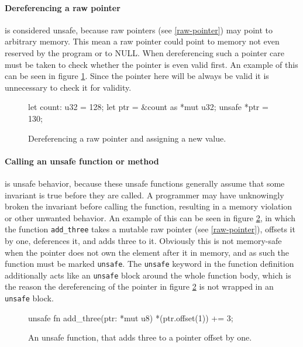 \documentclass[twocolumn]{article}
\begin{document}
\paragraph{Dereferencing a raw pointer} is considered unsafe, because raw pointers (see \ref{raw-pointer}) may point to arbitrary memory.
This mean a raw pointer could point to memory not even reserved by the program or to NULL.
When dereferencing such a pointer care must be taken to check whether the pointer is even valid first.
An example of this can be seen in figure \ref{unsafe-derefencing}.
Since the pointer here will be always be valid it is unnecessary to check it for validity.
\begin{figure}
\begin{rustcode}
let count: u32 = 128;
let ptr = &count as *mut u32;
unsafe {
    *ptr = 130;
}
\end{rustcode}
\vspace{-2em}
\caption{Dereferencing a raw pointer and assigning a new value.}
\label{unsafe-derefencing}
\end{figure}
\paragraph{Calling an unsafe function or method} is unsafe behavior, because these unsafe functions generally assume that some invariant is true before they are called.
A programmer may have unknowingly broken the invariant before calling the function, resulting in a memory violation or other unwanted behavior.
An example of this can be seen in figure \ref{unsafe-function}, in which the function \texttt{add_three} takes a mutable raw pointer (see \ref{raw-pointer}), offsets it by one, deferences it, and adds three to it.
Obviously this is not memory-safe when the pointer does not own the element after it in memory, and as such the function must be marked \texttt{unsafe}.
The \texttt{unsafe} keyword in the function definition additionally acts like an \texttt{unsafe} block around the whole function body, which is the reason the dereferencing of the pointer in figure \ref{unsafe-function} is not wrapped in an \texttt{unsafe} block.
\begin{figure}
\begin{rustcode}
unsafe fn add_three(ptr: *mut u8) {
        *(ptr.offset(1)) += 3;
}
\end{rustcode}
\vspace{-2em}
\caption{An unsafe function, that adds three to a pointer offset by one.}
\label{unsafe-function}
\end{figure}
\end{document}
